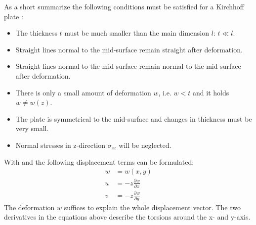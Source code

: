   As a short summarize the following conditions must be satisfied for a Kirchhoff plate \cite{steinke2005finite}:
  \begin{itemize}
  	\item The thickness $t$ must be much smaller than the main dimension $l$: $t \ll l$.
  	\item Straight lines normal to the mid-surface remain straight after deformation.
  	\item Straight lines normal to the mid-surface remain normal to the mid-surface after deformation.
  	\item There is only a small amount of deformation $w$, i.e. $w < t$ and it holds $w \ne w(z)$.
  	\item The plate is symmetrical to the mid-surface and changes in thickness must be very small.
  	\item Normal stresses in z-direction $\sigma_{zz}$ will be neglected.
  \end{itemize}
  
  With \cite{klein2013fem} and \cite{steinke2005finite} the following displacement terms can be formulated:
  \begin{align}
  w &= w(x,y) \\
  u &= -z \frac{\partial w}{\partial x}\\
  v &= -z \frac{\partial w}{\partial y}
  \end{align}
  The deformation $w$ suffices to explain the whole displacement vector. The two derivatives in the equations above describe the torsions around the x- and y-axis.

